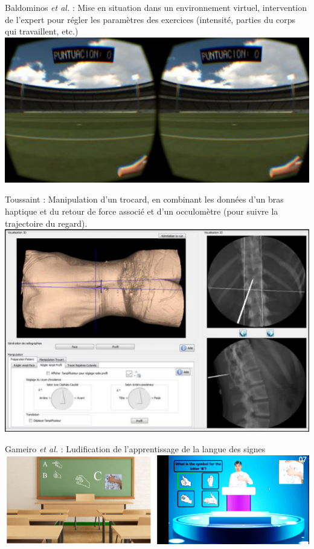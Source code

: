     
    \begin{frame}
    Baldominos \textit{et al.} : Mise en situation dans un environnement virtuel, intervention de l'expert pour régler les paramètres des exercices (intensité, parties du corps qui travaillent, etc.) \\
        \centering
        \includegraphics[scale=0.5]{img/eiah_baldominos.png}
    \end{frame}
    
    \begin{frame}{\secname}
        Toussaint : Manipulation d'un trocard, en combinant les données d'un bras haptique et du retour de force associé et d'un occulomètre (pour suivre la trajectoire du regard). \\
        \centering
        \includegraphics[scale=0.4]{img/eiah_toussaint.png}
    \end{frame}
    
    \begin{frame}{\secname}
         Gameiro \textit{et al.} : Ludification de l'apprentissage de la langue des signes \\
        \centering
        \includegraphics[scale=0.4]{img/eiah_gameiro.png}
    \end{frame}
    
